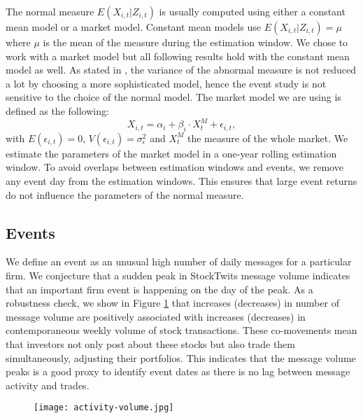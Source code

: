 The normal measure $E(X_{i,t}|Z_{i,t})$ is usually computed using either a constant mean model or a market model. Constant mean models use $E(X_{i,t}|Z_{i,t}) = \mu$ where $\mu$ is the mean of the measure during the estimation window. We chose to work with a market model but all following results hold with the constant mean model as well. As stated in \citet{mackinlay1997event}, the variance of the abnormal measure is not reduced a lot by choosing a more sophisticated model, hence the event study is not sensitive to the choice of the normal model. 
The market model we are using is defined as the following: 
\begin{equation*}\label{eq_mm}
    X_{i,t} = \alpha_i + \beta_i \cdot X_{t}^M + \epsilon_{i,t},
\end{equation*}
with $E(\epsilon_{i,t}) = 0$, $V(\epsilon_{i,t}) = \sigma_{\epsilon}^2$ and $X_{t}^M$ the measure of the whole market. We estimate the parameters of the market model in a one-year rolling estimation window. To avoid overlaps between estimation windows and events, we remove any event day from the estimation windows. This ensures that large event returns do not influence the parameters of the normal measure.

\subsection{Events}
We define an event as an unusual high number of daily messages for a particular firm. We conjecture that a sudden peak in StockTwits message volume indicates that an important firm event is happening on the day of the peak. As a robustness check, we show in Figure \ref{fig:actvol} that increases (decreases) in number of message volume are positively associated with increases (decreases) in contemporaneous weekly volume of stock transactions. These co-movements mean that investors not only post about these stocks but also trade them simultaneously, adjusting their portfolios. This indicates that the message volume peaks is a good proxy to identify event dates as there is no lag between message activity and trades.

\begin{figure}
    \centering
    \texttt{[image: activity-volume.jpg]}
    \label{fig:actvol}
\end{figure}

